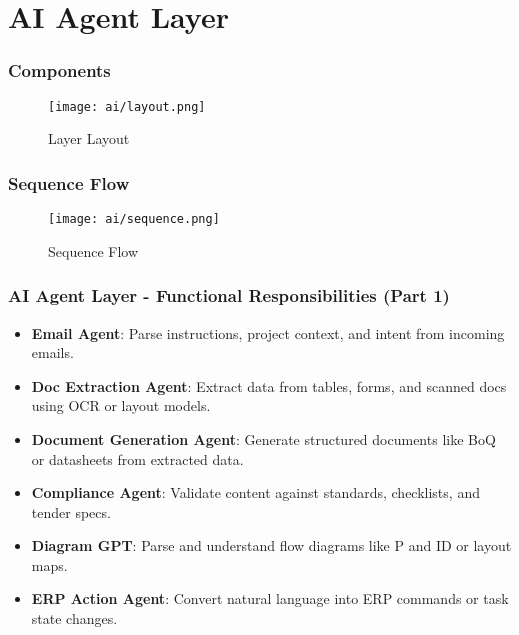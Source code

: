 \section{AI Agent Layer}

\begin{frame}
    \frametitle{Components}
    \begin{figure}
        \centering
        \texttt{[image: ai/layout.png]} %
        \caption{ Layer Layout}
    \end{figure}
\end{frame}

\begin{frame}
    \frametitle{ Sequence Flow}
    \begin{figure}
        \centering
        \texttt{[image: ai/sequence.png]} %
        \caption{ Sequence Flow}
    \end{figure}
\end{frame}



\begin{frame}
    \frametitle{AI Agent Layer - Functional Responsibilities (Part 1)}
    \begin{itemize}
        \item \textbf{Email Agent}: Parse instructions, project context, and intent from incoming emails.
        \item \textbf{Doc Extraction Agent}: Extract data from tables, forms, and scanned docs using OCR or layout models.
        \item \textbf{Document Generation Agent}: Generate structured documents like BoQ or datasheets from extracted data.
        \item \textbf{Compliance Agent}: Validate content against standards, checklists, and tender specs.
        \item \textbf{Diagram GPT}: Parse and understand flow diagrams like P and ID or layout maps.
        \item \textbf{ERP Action Agent}: Convert natural language into ERP commands or task state changes.
    \end{itemize}
\end{frame}


